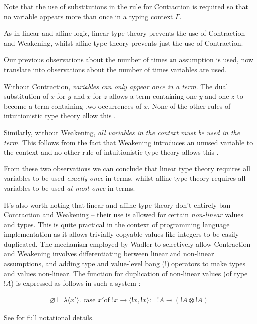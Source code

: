 \documentclass[]{unswthesis}
\newcommand{\case}{\text{ case }}
\newcommand{\of}{\text{of }}
\newcommand{\yields}{\multimap}
\begin{document}
Note that the use of substitutions in the rule for Contraction is required so that no variable appears more than once in a typing context $\Gamma$.

As in linear and affine logic, linear type theory prevents the use of Contraction and Weakening, whilst affine type theory prevents just the use of Contraction.

Our previous observations about the number of times an assumption is used, now translate into observations about the number of times variables are used.



Without Contraction, \textit{variables can only appear once in a term}. The dual substitution of $x$ for $y$ and $x$ for $z$ allows a term containing one $y$ and one $z$ to become a term containing two occurrences of $x$. None of the other rules of intuitionistic type theory allow this \cite{wadler93}.

Similarly, without Weakening, \textit{all variables in the context must be used in the term}. This follows from the fact that Weakening introduces an unused variable to the context and no other rule of intuitionistic type theory allows this \cite{wadler93}.

From these two observations we can conclude that linear type theory requires all variables to be used \textit{exactly once} in terms, whilst affine type theory requires all variables to be used \textit{at most once} in terms.

It's also worth noting that linear and affine type theory don't entirely ban Contraction and Weakening -- their use is allowed for certain \textit{non-linear} values and types. This is quite practical in the context of programming language implementation as it allows trivially copyable values like integers to be easily duplicated. The mechanism employed by Wadler \cite{wadler93} to selectively allow Contraction and Weakening involves differentiating between linear and non-linear assumptions, and adding type and value-level bang (!) operators to make types and values non-linear. The function for duplication of non-linear values (of type $!A$) is expressed as follows in such a system :

\begin{eqnarray*}
\varnothing \vdash \lambda \langle x' \rangle . \case x' \of !x \rightarrow \langle !x, !x\rangle :\text{ } !A \yields (!A \otimes !A)
\end{eqnarray*}

See \cite{wadler93} for full notational details.
\end{document}
